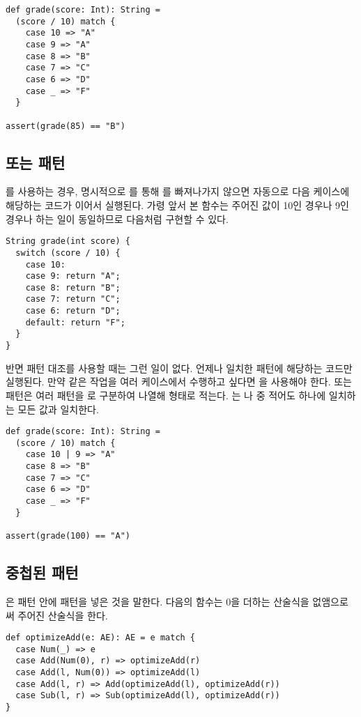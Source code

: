 \begin{verbatim}
def grade(score: Int): String =
  (score / 10) match {
    case 10 => "A"
    case 9 => "A"
    case 8 => "B"
    case 7 => "C"
    case 6 => "D"
    case _ => "F"
  }

assert(grade(85) == "B")
\end{verbatim}

\subsection{또는 패턴}

를 사용하는 경우, 명시적으로 를 통해
를 빠져나가지 않으면 자동으로 다음 케이스에 해당하는 코드가
이어서 실행된다. 가령 앞서 본  함수는 주어진 값이 10인 경우나 9인
경우나 하는 일이 동일하므로 다음처럼 구현할 수 있다.

\begin{verbatim}
String grade(int score) {
  switch (score / 10) {
    case 10:
    case 9: return "A";
    case 8: return "B";
    case 7: return "C";
    case 6: return "D";
    default: return "F";
  }
}
\end{verbatim}

반면 패턴 대조를 사용할 때는 그런 일이 없다. 언제나 일치한 패턴에 해당하는
코드만 실행된다. 만약 같은 작업을 여러 케이스에서 수행하고 싶다면 을 사용해야 한다. 또는 패턴은 여러 패턴을 \code{|}로 구분하여
나열해  형태로 적는다. 는
나  중 적어도 하나에 일치하는 모든 값과 일치한다.

\begin{verbatim}
def grade(score: Int): String =
  (score / 10) match {
    case 10 | 9 => "A"
    case 8 => "B"
    case 7 => "C"
    case 6 => "D"
    case _ => "F"
  }

assert(grade(100) == "A")
\end{verbatim}

\subsection{중첩된 패턴}

은 패턴 안에 패턴을 넣은 것을 말한다. 다음의
 함수는 0을 더하는 산술식을 없앰으로써 주어진 산술식을
한다.

\begin{verbatim}
def optimizeAdd(e: AE): AE = e match {
  case Num(_) => e
  case Add(Num(0), r) => optimizeAdd(r)
  case Add(l, Num(0)) => optimizeAdd(l)
  case Add(l, r) => Add(optimizeAdd(l), optimizeAdd(r))
  case Sub(l, r) => Sub(optimizeAdd(l), optimizeAdd(r))
}
\end{verbatim}

